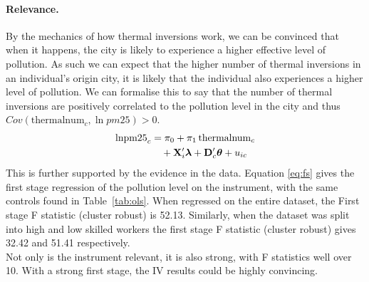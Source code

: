 \documentclass[11pt,twocolumn]{article}
\begin{document}
\paragraph{Relevance.}
By the mechanics of how thermal inversions work, we can be convinced that when it happens, the city is likely to experience a higher effective level of pollution. As such we can expect that the higher number of thermal inversions in an individual's origin city, it is likely that the individual also experiences a higher level of pollution. We can formalise this to say that the number of thermal inversions are positively correlated to the pollution level in the city and thus $Cov(\text{thermalnum}_c,\ln{pm25})>0$.
\begin{align}
  \text{lnpm25}_c &= \pi_0 + \pi_1 \,\text{thermalnum}_c \notag \\
  &\quad + \mathbf{X}_i'\boldsymbol{\lambda} + \mathbf{D}_c'\boldsymbol{\theta} + u_{ic} \label{eq:fs}
\end{align}
This is further supported by the evidence in the data. Equation \ref{eq:fs} gives the first stage regression of the pollution level on the instrument, with the same controls found in Table~\ref{tab:ols}. When regressed on the entire dataset, the First stage F statistic (cluster robust) is 52.13. Similarly, when the dataset was split into high and low skilled workers the first stage F statistic (cluster robust) gives 32.42 and 51.41 respectively.\\

Not only is the instrument relevant, it is also strong, with F statistics well over 10. With a strong first stage, the IV results could be highly convincing.
\end{document}
